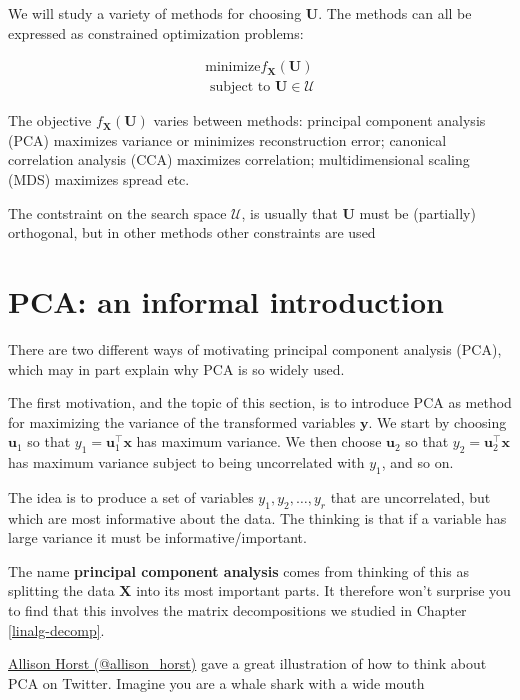 \documentclass[]{book}
\theoremstyle{definition}
\theoremstyle{definition}
\theoremstyle{definition}
\theoremstyle{remark}
\begin{document}
We will study a variety of methods for choosing \(\mathbf U\). The methods can all be expressed as constrained optimization problems:

\begin{align}
\mbox{minimize} f_{\mathbf X}(\mathbf U) \label{eq:dimredopt} \\
\mbox{ subject to } \mathbf U\in \mathcal{U} 
\end{align}

The objective \(f_{\mathbf X}(\mathbf U)\) varies between methods: principal component analysis (PCA) maximizes variance or minimizes reconstruction error; canonical correlation analysis (CCA) maximizes correlation; multidimensional scaling (MDS) maximizes spread etc.

The contstraint on the search space \(\mathcal{U}\), is usually that \(\mathbf U\) must be (partially) orthogonal, but in other methods other constraints are used

\hypertarget{pca-an-informal-introduction}{%
\section{PCA: an informal introduction}\label{pca-an-informal-introduction}}

There are two different ways of motivating
principal component analysis (PCA), which may in part explain why PCA is so widely used.

The first motivation, and the topic of this section, is to introduce PCA as method for maximizing the variance of the transformed variables \(\mathbf y\). We start by choosing \(\mathbf u_1\) so that \(y_1=\mathbf u_1^\top \mathbf x\) has maximum variance. We then choose \(\mathbf u_2\) so that \(y_2=\mathbf u_2^\top \mathbf x\) has maximum variance subject to being uncorrelated with \(y_1\), and so on.

The idea is to produce a set of variables \(y_1, y_2, \ldots, y_r\) that are uncorrelated, but which are most informative about the data. The thinking is that if a variable has large variance it must be informative/important.

The name \textbf{principal component analysis} comes from thinking of this as splitting the data \(\mathbf X\) into its most important parts. It therefore won't surprise you to find that this involves the matrix decompositions we studied in Chapter \ref{linalg-decomp}.

\href{https://twitter.com/allison_horst/status/1288904459490213888?lang=en}{Allison Horst (@allison\_horst)} gave a great illustration of how to think about PCA on Twitter. Imagine you are a whale shark with a wide mouth
\end{document}
